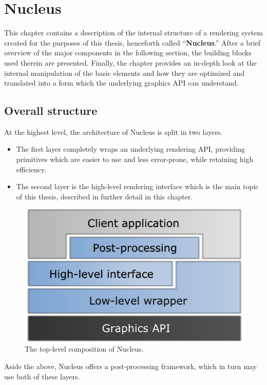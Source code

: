 

\chapter{ Nucleus }
\label{Chapter4}

This chapter contains a description of the internal structure of a rendering system created for the purposes of this thesis, henceforth called ``\textbf{Nucleus}.'' After a brief overview of the major components in the following section, the building blocks used therein are presented. Finally, the chapter provides an in-depth look at the internal manipulation of the basic elements and how they are optimized and translated into a form which the underlying graphics API can understand.

\section{Overall structure}

At the highest level, the architecture of Nucleus is split in two layers.
\begin{itemize}
\item The first layer completely wraps an underlying rendering API, providing primitives which are easier to use and less error-prone, while retaining high efficiency.
\item The second layer is the high-level rendering interface which is the main topic of this thesis, described in further detail in this chapter.
\end{itemize}

\begin{figure}[ht!]
  \centering
    \includegraphics[width=0.5\linewidth]{./Figures/layers.png}
    \caption[Nucleus Layers]{The top-level composition of Nucleus.}
  \label{fig:nucleusLayers}
\end{figure}

Aside the above, Nucleus offers a post-processing framework, which in turn may use both of these layers.

